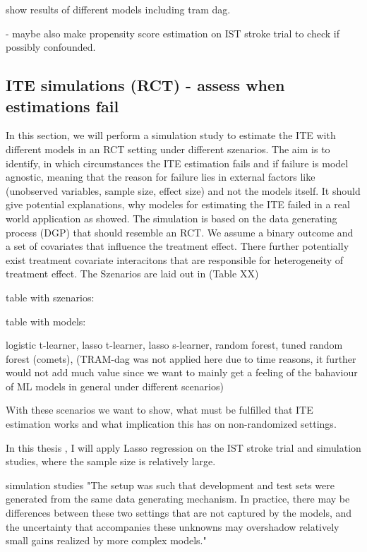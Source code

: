 show results of different models including tram dag.

- maybe also make propensity score estimation on IST stroke trial to check if possibly confounded.




\subsection{ITE simulations (RCT) - assess when estimations fail}

In this section, we will perform a simulation study to estimate the ITE with different models in an RCT setting under different szenarios. The aim is to identify, in which circumstances the ITE estimation fails and if failure is model agnostic, meaning that the reason for failure lies in external factors like (unobserved variables, sample size, effect size) and not the models itself. It should give potential explanations, why modeles for estimating the ITE failed in a real world application as \citet{chen2025} showed. The simulation is based on the data generating process (DGP) that should resemble an RCT. We assume a binary outcome and a set of covariates that influence the treatment effect. There further potentially exist treatment covariate interacitons that are responsible for heterogeneity of treatment effect. The Szenarios are laid out in (Table XX)

table with szenarios:



table with models:

logistic t-learner, lasso t-learner, lasso s-learner, random forest, tuned random forest (comets), (TRAM-dag was not applied here due to time reasons, it further would not add much value since we want to mainly get a feeling of the bahaviour of ML models in general under different scenarios)


With these scenarios we want to show, what must be fulfilled that ITE estimation works and what implication this has on non-randomized settings.




In this thesis , I will apply Lasso regression on the IST stroke trial and simulation studies, where the sample size is relatively large.


simulation studies
 "The setup was such that development and test sets were generated from the same data generating mechanism. In practice, there may be differences between these two settings that are not captured by the models, and the uncertainty that accompanies these unknowns may overshadow relatively small gains realized by more complex models."
 
